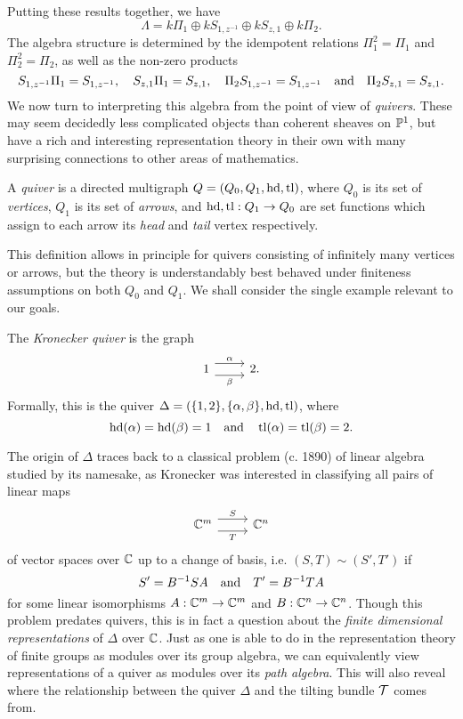 Putting these results together, we have
\[
  \Lambda = k \Pi_1 \oplus k S_{1, z^{-1}} \oplus k S_{z, 1} \oplus k \Pi_2.
\]
The algebra structure is determined by the idempotent relations
$\Pi_1^2 = \Pi_1$ and $\Pi_2^2 = \Pi_2$, as well as the non-zero products
\[
  S_{1, z^{-1}} \Pi_1 = S_{1, z^{-1}},
  \quad
  S_{z, 1} \Pi_1 = S_{z, 1},
  \quad
  \Pi_2 S_{1, z^{-1}} = S_{1, z^{-1}}
  \quad \text{and} \quad
  \Pi_2 S_{z, 1} = S_{z, 1}.
\]
We now turn to interpreting this algebra from the point of view of
\emph{quivers}.
These may seem decidedly less complicated objects than coherent
sheaves on $\mathbb{P}^{{1}}$, but have a rich and interesting representation
theory in their own with many surprising connections to other areas
of mathematics.

\begin{definition}
  A \emph{quiver} is a directed multigraph $Q = (Q_0, Q_1, \operatorname{hd},
  \operatorname{tl})$, where $Q_0$ is its set of \emph{vertices}, $Q_1$ is its set
  of \emph{arrows}, and $\operatorname{hd}, \operatorname{tl}: Q_1 \to Q_0$ are set functions
  which assign to each arrow its \emph{head} and \emph{tail} vertex
  respectively.
\end{definition}

This definition allows in principle for quivers consisting of
infinitely many vertices or arrows, but the theory is understandably
best behaved under finiteness assumptions on both $Q_0$ and $Q_1$.
We shall consider the single example relevant to our goals.

\begin{example}
  The \emph{Kronecker quiver} is the graph
  \[
    \begin{tikzcd}
      1 & 2.
      \arrow["\alpha", shift left=2, from=1-1, to=1-2]
      \arrow["\beta"', shift right=2, from=1-1, to=1-2]
    \end{tikzcd}
  \]
  Formally, this is the quiver $\Delta = (\{1, 2\}, \{\alpha,
  \beta\}, \operatorname{hd}, \operatorname{tl})$, where
  \[
    \operatorname{hd}(\alpha) = \operatorname{hd}(\beta) = 1
    \quad \text{and} \quad
    \operatorname{tl}(\alpha) = \operatorname{tl}(\beta) = 2.
  \]
  \vspace{-24pt}
\end{example}

The origin of $\Delta$ traces back to a classical problem (c. 1890)
of linear algebra studied by its namesake, as Kronecker was
interested in classifying all pairs of linear maps
\[
  \begin{tikzcd}
    {\bb{C}^m} & {\bb{C}^n}
    \arrow["S", shift left=2, from=1-1, to=1-2]
    \arrow["T"', shift right=2, from=1-1, to=1-2]
  \end{tikzcd}
\]
of vector spaces over $\mathbb{C}$ up to a change of basis, i.e. $(S, T)
\sim (S', T')$ if
\[
  S' = B^{-1} S A
  \quad \text{and} \quad
  T' = B^{-1} T A
\]
for some linear isomorphisms $A: \mathbb{C}^m \to \mathbb{C}^m$ and $B:
\mathbb{C}^n \to \mathbb{C}^n$.
Though this problem predates quivers, this is in fact a question
about the \emph{finite dimensional representations} of $\Delta$ over $\mathbb{C}$.
Just as one is able to do in the representation theory of finite
groups as modules over its group algebra, we can equivalently view
representations of a quiver as modules over its \emph{path algebra}.
This will also reveal where the relationship between the quiver
$\Delta$ and the tilting bundle $\mathcal{T}$ comes from.

